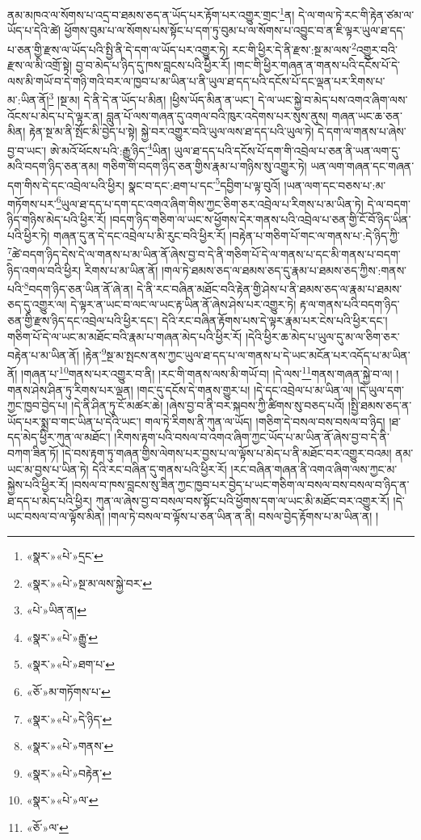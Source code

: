 ནམ་མཁའ་ལ་སོགས་པ་འདྲ་བ་ཐམས་ཅད་ན་ཡོད་པར་རྟོག་པར་འགྱུར་གྲང་\footnote{«སྣར་»«པེ་»དྲང་}ན། དེ་ལ་གལ་ཏེ་རང་གི་རྟེན་ཙམ་ལ་ཡོད་པ་དེའི་ཚེ། ཕྱོགས་བུམ་པ་ལ་སོགས་པས་སྟོང་པ་དག་ཏུ་བུམ་པ་ལ་སོགས་པ་འབྱུང་བ་ན་ཇི་ལྟར་ཡུལ་ཐ་དད་པ་ཅན་གྱི་རྫས་ལ་ཡོད་པའི་སྤྱི་ནི་དེ་དག་ལ་ཡོད་པར་འགྱུར་ཏེ། རང་གི་ཕྱིར་དེ་ནི་རྫས་:སྔ་མ་ལས་\footnote{«སྣར་»«པེ་»སྔ་མ་ལས་སྐྱེ་བར་}འགྱུར་བའི་རྫས་ལ་མི་འགྲོ་སྟེ། བྱ་བ་མེད་པ་ཉིད་དུ་ཁས་བླངས་པའི་ཕྱིར་རོ། །གང་གི་ཕྱིར་གཞན་ན་གནས་པའི་དངོས་པོ་དེ་ལས་མི་གཡོ་བ་དེ་གཉི་གའི་བར་ལ་ཁྱབ་པ་མ་ཡིན་པ་ནི་ཡུལ་ཐ་དད་པའི་དངོས་པོ་དང་ལྡན་པར་རིགས་པ་མ་:ཡིན་ནོ།\footnote{«པེ་»ཡིན་ན།} །སྔ་མ། དེ་ནི་དེ་ན་ཡོད་པ་མིན། །ཕྱིས་ཡོད་མིན་ན་ཡང་། དེ་ལ་ཡང་སྐྱེ་བ་མེད་པས་འགའ་ཞིག་ལས་འོངས་པ་མེད་པ་དེ་ལྟར་ན། བླུན་པོ་ལས་གཞན་དུ་འགལ་བའི་ཁུར་འདེགས་པར་སུས་ནུས། གཞན་ཡང་ཆ་ཅན་མིན། རྟེན་སྔ་མ་ནི་སྤོང་མི་བྱེད་པ་སྟེ། སྐྱེ་བར་འགྱུར་བའི་ཡུལ་ལས་ཐ་དད་པའི་ཡུལ་ཏེ། དེ་དག་ལ་གནས་པ་ཞེས་བྱ་བ་ཡང་། ཨེ་མའོ་ཕོངས་པའི་:རྒྱུ་ཉིད་\footnote{«སྣར་»«པེ་»རྒྱུ་}ཡིན། ཡུལ་ཐ་དད་པའི་དངོས་པོ་དག་གི་འབྲེལ་པ་ཅན་ནི་ཡན་ལག་དུ་མའི་བདག་ཉིད་ཅན་ནམ། གཅིག་གི་བདག་ཉིད་ཅན་གྱིས་རྣམ་པ་གཉིས་སུ་འགྱུར་ཏེ། ཡན་ལག་གཞན་དང་གཞན་དག་གིས་དེ་དང་འབྲེལ་པའི་ཕྱིར། སྣང་བ་དང་:ཐག་པ་དང་\footnote{«སྣར་»«པེ་»ཐག་པ་}དབྱིག་པ་ལྟ་བུའོ། །ཡན་ལག་དང་བཅས་པ་:མ་གཏོགས་པར་\footnote{«ཅོ་»མ་གཏོགས་པ་}ཡུལ་ཐ་དད་པ་དག་དང་འགའ་ཞིག་གིས་ཀྱང་ཅིག་ཅར་འབྲེལ་པ་རིགས་པ་མ་ཡིན་ཏེ། དེ་ལ་བདག་ཉིད་གཉིས་མེད་པའི་ཕྱིར་རོ། །བདག་ཉིད་གཅིག་ལ་ཡང་ས་ཕྱོགས་དེར་གནས་པའི་འབྲེལ་པ་ཅན་གྱི་ངོ་བོ་ཉིད་ཡིན་པའི་ཕྱིར་ཏེ། གཞན་དུ་ན་དེ་དང་འབྲེལ་པ་མི་རུང་བའི་ཕྱིར་རོ། །བརྟེན་པ་གཅིག་པོ་གང་ལ་གནས་པ་:དེ་ཉིད་ཀྱི་\footnote{«སྣར་»«པེ་»དེ་ཉིད་}ཚེ་བདག་ཉིད་དེས་དེ་ལ་གནས་པ་མ་ཡིན་ནོ་ཞེས་བྱ་བ་དེ་ནི་གཅིག་པོ་དེ་ལ་གནས་པ་དང་མི་གནས་པ་བདག་ཉིད་འགལ་བའི་ཕྱིར། རིགས་པ་མ་ཡིན་ནོ། །གལ་ཏེ་ཐམས་ཅད་ལ་ཐམས་ཅད་དུ་རྣམ་པ་ཐམས་ཅད་ཀྱིས་:གནས་པའི་\footnote{«སྣར་»«པེ་»གནས་}བདག་ཉིད་ཅན་ཡིན་ནོ་ཞེ་ན། དེ་ནི་རང་བཞིན་མཐོང་བའི་རྟེན་གྱི་ཤེས་པ་ནི་ཐམས་ཅད་ལ་རྣམ་པ་ཐམས་ཅད་དུ་འགྱུར་ལ། དེ་ལྟར་ན་ཡང་བ་ལང་ལ་ཡང་རྟ་ཡིན་ནོ་ཞེས་ཤེས་པར་འགྱུར་ཏེ། རྟ་ལ་གནས་པའི་བདག་ཉིད་ཅན་གྱི་རྫས་ཉིད་དང་འབྲེལ་པའི་ཕྱིར་དང་། དེའི་རང་བཞིན་རྟོགས་པས་དེ་ལྟར་རྣམ་པར་ངེས་པའི་ཕྱིར་དང་། གཅིག་པོ་དེ་ལ་ཡང་མ་མཐོང་བའི་རྣམ་པ་གཞན་མེད་པའི་ཕྱིར་རོ། །དེའི་ཕྱིར་ཆ་མེད་པ་ཡུལ་དུ་མ་ལ་ཅིག་ཅར་བརྟེན་པ་མ་ཡིན་ནོ། །རྟེན་\footnote{«སྣར་»«པེ་»བརྟེན་}སྔ་མ་སྤངས་ནས་ཀྱང་ཡུལ་ཐ་དད་པ་ལ་གནས་པ་དེ་ཡང་མངོན་པར་འདོད་པ་མ་ཡིན་ནོ། །གཞན་པ་\footnote{«སྣར་»«པེ་»ལ་}གནས་པར་འགྱུར་བ་ནི། །རང་གི་གནས་ལས་མི་གཡོ་བ། །དེ་ལས་\footnote{«ཅོ་»ལ་}གནས་གཞན་སྐྱེ་བ་ལ། །གནས་ཤེས་ཤིན་ཏུ་རིགས་པར་ལྡན། །གང་དུ་དངོས་དེ་གནས་གྱུར་པ། །དེ་དང་འབྲེལ་པ་མ་ཡིན་ལ། །དེ་ཡུལ་དག་ཀྱང་ཁྱབ་བྱེད་པ། །དེ་ནི་ཤིན་ཏུ་ངོ་མཚར་ཆེ། །ཞེས་བྱ་བ་ནི་བར་སྐབས་ཀྱི་ཚིགས་སུ་བཅད་པའོ། །སྤྱི་ཐམས་ཅད་ན་ཡོད་པར་སྨྲ་བ་གང་ཡིན་པ་དེའི་ཡང་། གལ་ཏེ་རིགས་ནི་ཀུན་ལ་ཡོད། །གཅིག་དེ་བསལ་བས་བསལ་བ་ཉིད། །ཐ་དད་མེད་ཕྱིར་ཀུན་ལ་མཐོང་། །རིགས་རྟག་པའི་བསལ་བ་འགའ་ཞིག་ཀྱང་ཡོད་པ་མ་ཡིན་ནོ་ཞེས་བྱ་བ་དེ་ནི་བཀག་ཟིན་ཏོ། །དེ་བས་རྟག་ཏུ་གཞན་གྱིས་ལེགས་པར་བྱས་པ་ལ་ལྟོས་པ་མེད་པ་ནི་མཐོང་བར་འགྱུར་བའམ། ནམ་ཡང་མ་བྱས་པ་ཡིན་ཏེ། དེའི་རང་བཞིན་དུ་གནས་པའི་ཕྱིར་རོ། །རང་བཞིན་གཞན་ནི་འགའ་ཞིག་ལས་ཀྱང་མ་སྐྱེས་པའི་ཕྱིར་རོ། །བསལ་བ་ཁས་བླངས་སུ་ཟིན་ཀྱང་ཁྱབ་པར་བྱེད་པ་ཡང་གཅིག་ལ་བསལ་བས་བསལ་བ་ཉིད་ན་ཐ་དད་པ་མེད་པའི་ཕྱིར། ཀུན་ལ་ཞེས་བྱ་བ་བསལ་བས་སྟོང་པའི་ཕྱོགས་དག་ལ་ཡང་མི་མཐོང་བར་འགྱུར་རོ། །དེ་ཡང་བསལ་བ་ལ་ལྟོས་མིན། །གལ་ཏེ་བསལ་བ་ལྟོས་པ་ཅན་ཡིན་ན་ནི། བསལ་བྱེད་རྟོགས་པ་མ་ཡིན་ན། །
